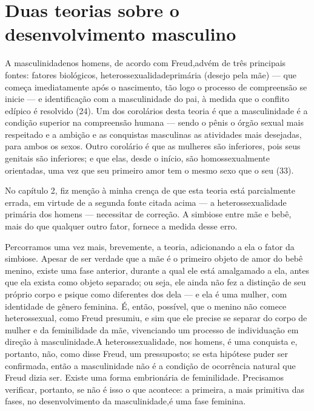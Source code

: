 \section{Duas teorias sobre o desenvolvimento masculino}

A masculinidade\idxmascu[|(] nos homens, de acordo com Freud,\idxfreudmascu[|(] advém de três
principais fontes: fatores biológicos, heterossexualidade\idxheteroprim[|(] primária
(desejo pela mãe) --- que começa imediatamente após o nascimento, tão
logo o processo de compreensão se inicie --- e identificação\idxident{} com a
masculinidade do pai, à medida que o conflito edípico é resolvido
(24). Um dos corolários desta teoria é que a masculinidade é a condição
superior na compreensão humana --- sendo o pênis o órgão sexual mais
respeitado e a ambição e as conquistas masculinas as atividades mais
desejadas, para ambos os sexos. Outro corolário é que as mulheres são
inferiores, pois seus genitais são inferiores;\idxcondfinfe{} e que elas, desde o
início, são homossexualmente orientadas, uma vez que seu primeiro amor
tem o mesmo sexo que o seu (33).

No capítulo 2, fiz menção à minha crença de que esta teoria está
parcialmente errada, em virtude de a segunda fonte citada acima --- a
heterossexualidade primária dos homens --- necessitar de correção. A
simbiose entre mãe e bebê, mais do que qualquer outro fator, fornece a
medida desse erro.

Percorramos uma vez mais, brevemente, a teoria, adicionando a ela o
fator da simbiose. Apesar de ser verdade que a mãe é o primeiro objeto
de amor do bebê menino, existe uma fase anterior, durante a qual ele
está amalgamado a ela, antes que ela exista como objeto separado; ou
seja, ele ainda não fez a distinção de seu próprio corpo e psique como
diferentes dos dela --- e ela é uma mulher, com identidade de gênero
feminina. É, então, possível, que o menino não comece heterossexual,\label{cita1}
como Freud presumiu, e sim que ele precise se separar do corpo de
mulher e da feminilidade da mãe, vivenciando um processo de
individuação em direção à masculinidade.\idxmascupap[|(] A heterossexualidade, nos
homens, é uma conquista e, portanto, não, como disse Freud, um
pressuposto; se esta hipótese puder ser confirmada, então a
masculinidade não é a condição de ocorrência natural que Freud dizia
ser. Existe uma forma embrionária de feminilidade. Precisamos
verificar, portanto, se não é isso o que acontece: a primeira, a mais
primitiva das fases, no desenvolvimento da masculinidade,\idxheteroprim[|)] é uma fase
feminina.


